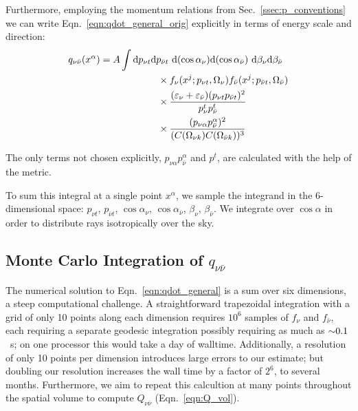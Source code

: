 Furthermore, employing the momentum relations from Sec.~\ref{ssec:p_conventions}
we can write Eqn.~\ref{eqn:qdot_general_orig} explicitly in terms of energy
scale and direction:
\begin{equation}
  \begin{split}
    \label{eqn:qdot_general}
    q_{\nu \bar{\nu}}(x^\alpha)
    &= A \int \mathrm{d} p_{\nu t} \mathrm{d} p_{\bar{\nu} t} \,\,
    \mathrm{d} (\cos \alpha_{\nu}) \mathrm{d} (\cos \alpha_{\bar{\nu}}) \,\, \mathrm{d} \beta_{\nu} \mathrm{d} \beta_{\bar{\nu}} \\
    & \qquad \qquad \qquad
    \times f_{\nu}(x^j;p_{\nu t},\Omega_{\nu})
    f_{\bar{\nu}}(x^j;p_{\bar{\nu} t},\Omega_{\bar{\nu}}) \\
    & \qquad \qquad \qquad
    \times \frac{(\varepsilon_{\nu} + \varepsilon_{\bar{\nu}})(p_{\nu t} p_{\bar{\nu} t})^2}
           {p_{\nu}^t p_{\bar{\nu}}^t} \\
           & \qquad \qquad \qquad
           \times \frac {(p_{\nu \alpha} p_{\bar{\nu}}^\alpha)^2}
                  {(C(\Omega_{\nu k})C(\Omega_{\bar{\nu} k}))^3}
  \end{split}
\end{equation}

The only terms not chosen explicitly, $p_{\nu \alpha} p_{\bar{\nu}}^\alpha$
and $p^t$, are calculated with the help of the metric.

To sum this integral at a single point $x^\alpha$,
we sample the integrand in the 6-dimensional space:
$p_{\nu t}$,
$p_{\bar{\nu} t}$,
$\cos \alpha_{\nu}$,
$\cos \alpha_{\bar{\nu}}$,
$\beta_{\nu}$,
$\beta_{\bar{\nu}}$.
We integrate over $\cos \alpha$ in order to distribute rays isotropically over
the sky.

\subsection{Monte Carlo Integration of $q_{\nu\bar{\nu}}$}
\label{ssec:monte_carlo}
The numerical solution to Eqn.~\ref{eqn:qdot_general} is a sum over
six dimensions, a steep computational challenge.
A straightforward trapezoidal integration with a grid of only 10
points along each dimension requires $10^6$ samples of $f_\nu$ and
$f_{\bar{\nu}}$, each requiring a separate geodesic integration possibly
requiring as much as $\mathord{\sim}0.1$~s;
on one processor this would take a day of walltime.
Additionally, a resolution of only 10 points per dimension introduces large
errors to our estimate; but doubling our resolution increases the wall time
by a factor of $2^6$, to several months.
Furthermore, we aim to repeat this calcultion at many points throughout the
spatial volume to compute $Q_{\nu\bar{\nu}}$ (Eqn.~\ref{eqn:Q_vol}).

